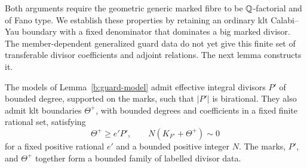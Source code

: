 Both arguments require the geometric generic marked fibre to be
\(\mathbb Q\)-factorial and of Fano type. We establish these properties by
retaining an ordinary klt Calabi--Yau boundary with a fixed denominator
that dominates a big marked divisor. The member-dependent generalized
guard data do not yet give this finite set of transferable divisor
coefficients and adjoint relations. The next lemma constructs it.

\begin{lemma}
\label{b:bounded-guard-boundary}
The models of Lemma~\ref{b:guard-model} admit effective integral divisors
\(P'\) of bounded degree, supported on the marks, such that \(|P'|\) is
birational. They also admit klt boundaries \(\Theta^+\), with bounded
degrees and coefficients in a fixed finite rational set, satisfying
\[
 \Theta^+\geq e'P',\qquad N(K_{F'}+\Theta^+)\sim0
\]
for a fixed positive rational \(e'\) and a bounded positive integer \(N\).
The marks, \(P'\), and \(\Theta^+\) together form a bounded family of
labelled divisor data.
\end{lemma}

